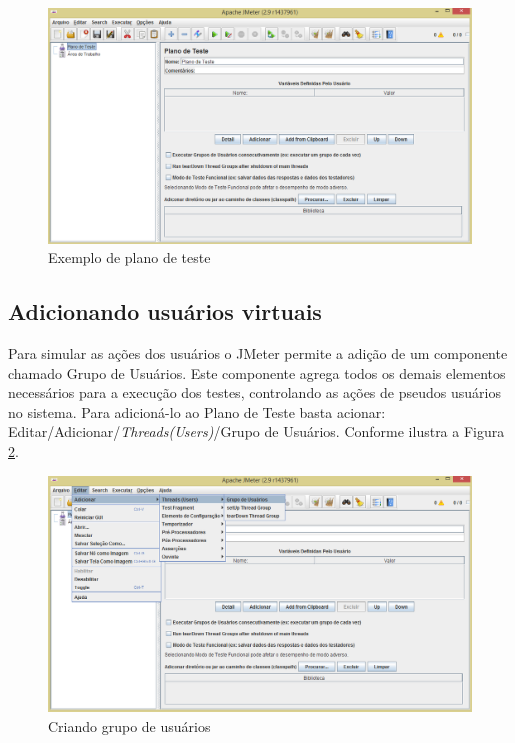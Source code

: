    \begin{figure}[htb]
    \centering
    \includegraphics[scale=0.5]{imagens/plantest.png}
    \caption{Exemplo de plano de teste}
    \label{fig:plantest}
    \end{figure}

\subsection{Adicionando usuários virtuais}

Para simular as ações dos usuários o JMeter permite a adição de um componente chamado Grupo de Usuários. Este componente agrega todos os demais elementos necessários para a execução dos testes, controlando as ações de pseudos usuários no
sistema. Para adicioná-lo ao Plano de Teste basta acionar: Editar/Adicionar/\textit{Threads(Users)}/Grupo de Usuários. Conforme ilustra a Figura \ref{fig:grupodeusuarios}.

   \begin{figure}[htb]
    \centering
    \includegraphics[scale=0.5]{imagens/usergroup.png}
    \caption{Criando grupo de usuários}
    \label{fig:grupodeusuarios}
    \end{figure}


